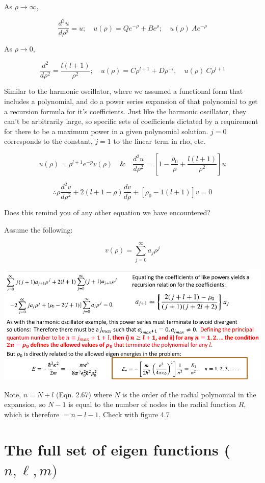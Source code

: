 \documentclass{article}
\begin{document}
As $\rho \to \infty$, 

$$\frac{d^2 u}{d \rho^2} = u; \quad u(\rho) = Qe^{- \rho} + Be^\rho; \quad u(\rho) ~ Ae^{- \rho}$$

As $\rho \to 0$, 

$$\frac{d^2}{d \rho^2} = \frac{l(l+1)}{\rho^2}; \quad u(\rho) = C \rho^{l+1} + D \rho^{- l}, \quad u(\rho) ~ C \rho^{l+1}$$

Similar to the harmonic oscillator, where we assumed a functional form that includes a polynomial, and do a power series expansion of that polynomial to get a recursion formula for it’s coefficients. Just like the harmonic oscillator, they can’t be arbitrarily large, so specific sets of coefficients dictated by a requirement for there to be a maximum power in a given polynomial solution.  $j=0$ corresponds to the constant, $j=1$ to the linear term in rho, etc.


$$u(\rho) = \rho^{l+1} e^{-p} v(\rho) \quad \& \quad \frac{d^2 u}{d \rho^2} = \left[ 1 - \frac{\rho_0}{\rho} + \frac{l(l+1)}{\rho^2} \right] u$$

$$\therefore \rho \frac{d^2 v}{d \rho^2} + 2(l+1-\rho) \frac{dv}{d \rho} + \left[ \rho_0 - 1(l+1) \right] v = 0$$

Does this remind you of any other equation we have encountered?

Assume the following:

$$v(\rho) = \sum_{j=0}^\infty a_j \rho^j$$

\includegraphics[width = 0.9 \textwidth]{Lecture20/4.png}

Note, $n=N+l$ (Eqn. 2.67) where $N$ is the order of the radial polynomial in the expansion, so $N-1$ is equal to the number of nodes in the radial function $R$, which is therefore $= n-l-1$. Check with figure 4.7

\section{The full set of eigen functions ($n, \ell, m)$}
\end{document}
